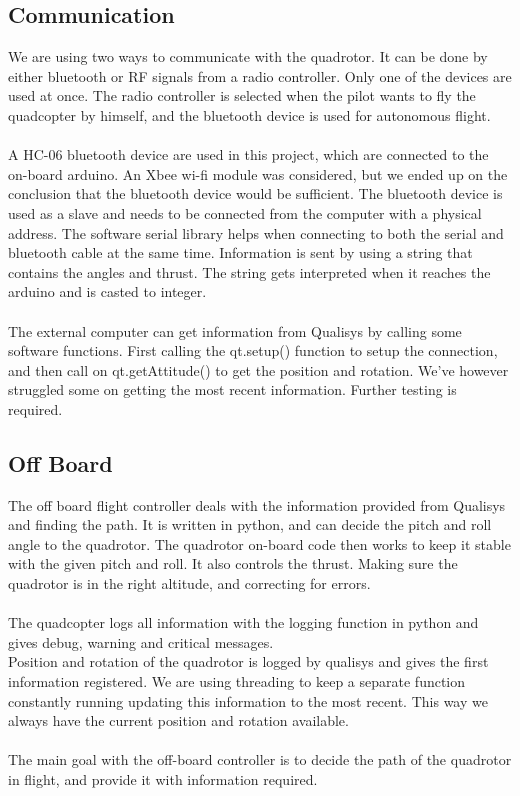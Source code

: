 \clearpage   %



\subsection{Communication}

We are using two ways to communicate with the quadrotor. It can be done by either bluetooth or RF signals from a radio controller. Only one of the devices are used at once. The radio controller is selected when the pilot wants to fly the quadcopter by himself, and the bluetooth device is used for autonomous flight.\\
\\
A HC-06 bluetooth device are used in this project, which are connected to the on-board arduino. An Xbee wi-fi module was considered, but we ended up on the conclusion that the bluetooth device would be sufficient. The bluetooth device is used as a slave and needs to be connected from the computer with a physical address. The software serial library helps when connecting to both the serial and bluetooth cable at the same time. Information is sent by using a string that contains the angles and thrust. The string gets interpreted when it reaches the arduino and is casted to integer.
\\\\
The external computer can get information from Qualisys by calling some software functions. First calling the qt.setup() function to setup the connection, and then call on qt.getAttitude() to get the position and rotation. We've however struggled some on getting the most recent information. Further testing is required. 

\subsection{Off Board}
The off board flight controller deals with the information provided from Qualisys and finding the path. It is written in python, and can decide the pitch and roll angle to the quadrotor. The quadrotor on-board code then works to keep it stable with the given pitch and roll. It also controls the thrust. Making sure the quadrotor is in the right altitude, and correcting for errors. \\
\\
The quadcopter logs all information with the logging function in python and gives debug, warning and critical messages. \\
Position and rotation of the quadrotor is logged by qualisys and gives the first information registered. We are using threading to keep a separate function constantly running updating this information to the most recent. This way we always have the current position and rotation available. \\
\\
The main goal with the off-board controller is to decide the path of the quadrotor in flight, and provide it with information required. \\
